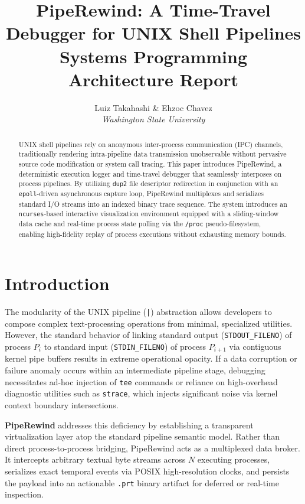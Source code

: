 \documentclass[11pt,a4paper,twoside]{article}
\title{
    \vspace{-1.5cm}
    \textbf{\Large PipeRewind: A Time-Travel Debugger for UNIX Shell Pipelines}\\
    \large Systems Programming Architecture Report
}
\author{
    Luiz Takahashi \quad \& \quad Ehzoc Chavez\\
    \small\textit{Washington State University}
}
\date{\vspace{-3ex}}
\begin{document}
\maketitle
\thispagestyle{empty}

\begin{abstract}
\noindent
UNIX shell pipelines rely on anonymous inter-process communication (IPC) channels, traditionally rendering intra-pipeline data transmission unobservable without pervasive source code modification or system call tracing. This paper introduces PipeRewind, a deterministic execution logger and time-travel debugger that seamlessly interposes on process pipelines. By utilizing \texttt{dup2} file descriptor redirection in conjunction with an \texttt{epoll}-driven asynchronous capture loop, PipeRewind multiplexes and serializes standard I/O streams into an indexed binary trace sequence. The system introduces an \texttt{ncurses}-based interactive visualization environment equipped with a sliding-window data cache and real-time process state polling via the \texttt{/proc} pseudo-filesystem, enabling high-fidelity replay of process executions without exhausting memory bounds. 
\end{abstract}

\section{Introduction}

The modularity of the UNIX pipeline (\texttt{|}) abstraction allows developers to compose complex text-processing operations from minimal, specialized utilities. However, the standard behavior of linking standard output (\texttt{STDOUT\_FILENO}) of process $P_i$ to standard input (\texttt{STDIN\_FILENO}) of process $P_{i+1}$ via contiguous kernel pipe buffers results in extreme operational opacity. If a data corruption or failure anomaly occurs within an intermediate pipeline stage, debugging necessitates ad-hoc injection of \texttt{tee} commands or reliance on high-overhead diagnostic utilities such as \texttt{strace}, which injects significant noise via kernel context boundary intersections.

\textbf{PipeRewind} addresses this deficiency by establishing a transparent virtualization layer atop the standard pipeline semantic model. Rather than direct process-to-process bridging, PipeRewind acts as a multiplexed data broker. It intercepts arbitrary textual byte streams across $N$ executing processes, serializes exact temporal events via POSIX high-resolution clocks, and persists the payload into an actionable \texttt{.prt} binary artifact for deferred or real-time inspection.
\end{document}
